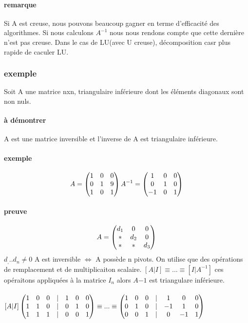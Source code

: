 \documentclass[a4paper,10pt]{article}
\begin{document}
\paragraph{remarque}
Si A est creuse, nous pouvons beaucoup gagner en terme d'efficacité des algorithmes. Si nous calculons $A^{-1}$ nous nous rendons 
compte que cette dernière n'est pas creuse. Dans le cas de LU(avec U creuse), décomposition casr plus rapide de caculer LU.
\subsubsection{exemple}
Soit A une matrice nxn, triangulaire inférieure dont les éléments diagonaux sont non nuls.
\paragraph{à démontrer}
A est une matrice inversible et l'inverse de A est triangulaire inférieure.
\paragraph{exemple}
\[
A=
\begin{pmatrix}
1&0&0\cr
0&1&9\cr
1&0&1\cr
\end{pmatrix}
A^{-1}=
\begin{pmatrix}
1&0&0\cr
0&1&0\cr
-1&0&1\cr
\end{pmatrix}
\]
\paragraph{preuve}
\[
A=
\begin{pmatrix}
d_1&0&0\cr
*&d_2&0\cr
*&*&d_3\cr
\end{pmatrix}
\]
$d_,..d_n\neq 0$
\newline
A est inversible $\Leftrightarrow$ A possède n pivots.
On utilise que des opérations de remplacement et de multiplicaiton scalaire.
\newline
$[A|I]\equiv...\equiv[I|A^{-1}]$
\newline
ces opéraitons appliquées à la matrice $I_n$ alors $A{-1}$ est triangulare inférieure.
\paragraph{}
$[A|I]
\begin{pmatrix}
1&0&0&|&1&0&0\cr
1&1&0&|&0&1&0\cr
1&1&1&|&0&0&1\cr
\end{pmatrix}
\equiv...\equiv
\begin{pmatrix}
1&0&0&|&1&0&0\cr
0&1&0&|&-1&1&0\cr
0&0&1&|&0&-1&1\cr
\end{pmatrix}
$
\end{document}
